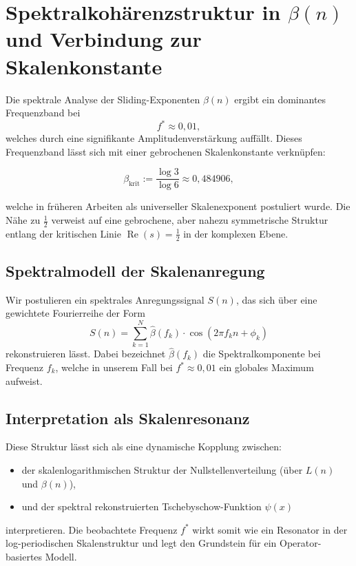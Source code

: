 \section{Spektralkohärenzstruktur in $\beta(n)$ und Verbindung zur Skalenkonstante}

Die spektrale Analyse der Sliding-Exponenten $\beta(n)$ ergibt ein dominantes Frequenzband bei
\[
f^* \approx 0{,}01,
\]
welches durch eine signifikante Amplitudenverstärkung auffällt. Dieses Frequenzband lässt sich mit einer gebrochenen Skalenkonstante verknüpfen:

\begin{equation}
\beta_{\text{krit}} := \frac{\log 3}{\log 6} \approx 0{,}484906,
\end{equation}

welche in früheren Arbeiten als universeller Skalenexponent postuliert wurde. Die Nähe zu $\frac{1}{2}$ verweist auf eine gebrochene, aber nahezu symmetrische Struktur entlang der kritischen Linie $\operatorname{Re}(s) = \frac{1}{2}$ in der komplexen Ebene.

\subsection*{Spektralmodell der Skalenanregung}

Wir postulieren ein spektrales Anregungssignal $S(n)$, das sich über eine gewichtete Fourierreihe der Form
\[
S(n) = \sum_{k=1}^{N} \hat{\beta}(f_k) \cdot \cos(2\pi f_k n + \phi_k)
\]
rekonstruieren lässt. Dabei bezeichnet $\hat{\beta}(f_k)$ die Spektralkomponente bei Frequenz $f_k$, welche in unserem Fall bei $f^* \approx 0{,}01$ ein globales Maximum aufweist.

\subsection*{Interpretation als Skalenresonanz}

Diese Struktur lässt sich als eine dynamische Kopplung zwischen:

\begin{itemize}
\item der skalenlogarithmischen Struktur der Nullstellenverteilung (über $L(n)$ und $\beta(n)$),
\item und der spektral rekonstruierten Tschebyschow-Funktion $\psi(x)$
\end{itemize}

interpretieren. Die beobachtete Frequenz $f^*$ wirkt somit wie ein Resonator in der log-periodischen Skalenstruktur und legt den Grundstein für ein Operator-basiertes Modell.